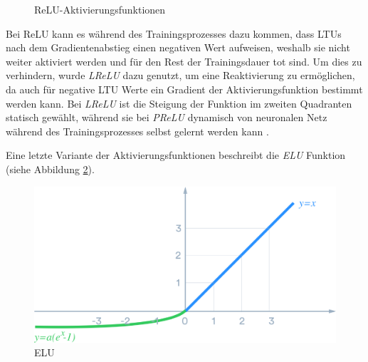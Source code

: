 \begin{figure}[ht]
	\caption[ReLU-Aktivierungsfunktionen]{ReLU-Aktivierungsfunktionen \cite{DanqingLiu.20171130}} 
	\label{relu}
\end{figure} 

Bei ReLU kann es während des Trainingsprozesses dazu kommen, dass LTUs nach dem Gradientenabstieg einen negativen Wert aufweisen, weshalb sie nicht weiter aktiviert werden und für den Rest der Trainingsdauer \glqq tot\grqq{} sind. Um dies zu verhindern, wurde \textit{LReLU} dazu genutzt, um eine Reaktivierung zu ermöglichen, da auch für negative LTU Werte ein Gradient der Aktivierungsfunktion bestimmt werden kann. Bei \textit{LReLU} ist die Steigung der Funktion im zweiten Quadranten statisch gewählt, während sie bei \textit{PReLU} dynamisch von neuronalen Netz während des Trainingsprozesses selbst gelernt werden kann \cite{AurelienGeron.2018}.

Eine letzte Variante der Aktivierungsfunktionen beschreibt die \textit{ELU} Funktion (siehe Abbildung \ref{elu}).

\begin{figure}[ht]
	\begin{center}
		\includegraphics[width=12cm]{Bilder/elu.png} 
		\caption[ELU]{ELU \cite{DanqingLiu.20171130}}
		\label{elu}
	\end{center}
\end{figure}

